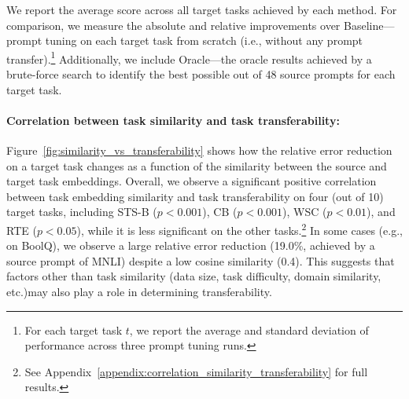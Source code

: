 We report the average score across all target tasks achieved by each method. For comparison, we measure the absolute and relative improvements over {\small \sc Baseline}---prompt tuning on each target task from scratch (i.e., without any prompt transfer).\footnote{For each target task $t$, we report the average and standard deviation of performance across three prompt tuning runs.} Additionally, we include {\small \sc Oracle}---the oracle results achieved by a brute-force search to identify the best possible out of 48 source prompts for each target task.

\paragraph{Correlation between task similarity and task transferability:}
Figure~\ref{fig:similarity_vs_transferability} shows how the relative error reduction on a target task changes as a function of the similarity between the source and target task embeddings. Overall, we observe a significant positive correlation between task embedding similarity and task transferability on four (out of 10) target tasks, including {\small \sc STS-B} ($p < 0.001$), {\small \sc CB} ($p < 0.001$), {\small \sc WSC} ($p < 0.01$), and {\small \sc RTE} ($p < 0.05$), while it is less significant on the other tasks.\footnote{See Appendix~\ref{appendix:correlation_similarity_transferability} for full results.} In some cases (e.g., on {\small \sc BoolQ}), we observe a large relative error reduction (19.0\%, achieved by a source prompt of {\small \sc MNLI}) despite a low cosine similarity (0.4). This suggests that factors other than task similarity (data size, task difficulty, domain similarity, etc.)\@ may also play a role in determining transferability.
